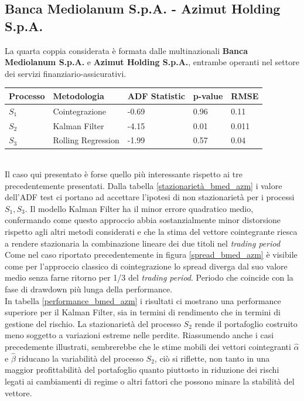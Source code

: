 \documentclass[]{article}
\begin{document}
\break

\subsection*{Banca Mediolanum S.p.A. - Azimut Holding S.p.A. }

La quarta coppia considerata è formata dalle multinazionali \textbf{Banca Mediolanum S.p.A.} e  \textbf{Azimut Holding S.p.A.}, entrambe operanti nel settore dei servizi finanziario-assicurativi.

\begin{center}
	\label{stazionarietà_bmed_azm}
	\begin{tabular}{ p{2cm}p{3cm}p{1cm}p{2cm}p{1cm}}
	\hline
	Processo & Metodologia & ADF Statistic & p-value & RMSE \\
	\hline
	$S_1$ & Cointegrazione &-0.69 &  0.96 & 0.11 \\
	$S_2$ & Kalman Filter & -4.15 &  0.01 & 0.011 \\
	$S_3$ & Rolling Regression & -1.99 & 0.57 & 0.04 \\
	\hline
	\end{tabular}
\end{center}
\
\\
Il caso qui presentato è forse quello più interessante rispetto ai tre precedentemente presentati.
Dalla tabella \ref{stazionarietà_bmed_azm} i valore dell'ADF test ci portano ad accettare l'ipotesi di non stazionarietà per i processi $S_1, S_3$.
Il modello Kalman Filter ha il minor errore quadratico medio, confermando come questo approccio abbia sostanzialmente minor distorsione rispetto agli altri metodi considerati e che la stima del vettore cointegrante riesca a rendere stazionaria la combinazione lineare dei due titoli nel \textit{trading period}
\\
Come nel caso riportato precedentemente in figura \ref{spread_bmed_azm} è visibile come per l'approccio classico di cointegrazione lo spread diverga dal suo valore medio senza farne ritorno per 1/3 del \textit{trading period}. Periodo che coincide con la fase di drawdown più lunga della performance.
\\
In tabella \ref{performance_bmed_azm} i risultati ci mostrano una performance superiore per il Kalman Filter, sia in termini di rendimento che in termini di gestione del rischio.
La stazionarietà del processo $S_2$ rende il portafoglio costruito meno soggetto a variazioni estreme nelle perdite. Riassumendo anche i casi precedemente illustrati, sembrerebbe che le stime mobili dei vettori cointegranti $\hat{\alpha}$ e $\hat{\beta}$ riducano la variabilità del processo $S_2$, ciò si riflette, non tanto in una maggior profittabilità del portafoglio quanto piuttosto in riduzione dei rischi legati ai cambiamenti di regime o altri fattori che possono minare la stabilità del vettore.
\end{document}
